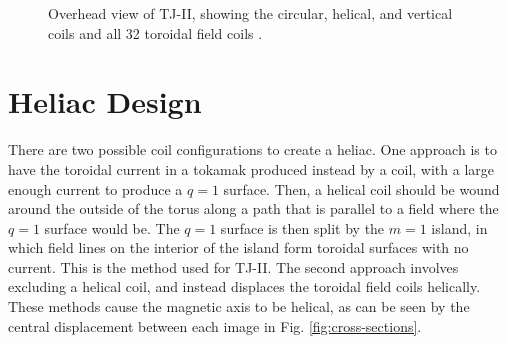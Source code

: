 \documentclass[a4paper]{article}
\begin{document}
\begin{figure}[tb]
\begin{minipage}{0.46\linewidth}
	\caption{Overhead view of TJ-II, showing the circular, helical, and vertical coils and all 32 toroidal field coils \cite{solano_study_1988}.}
	\label{fig:coils}
\end{minipage}
\end{figure}


\section*{Heliac Design}
There are two possible coil configurations to create a heliac.
One approach is to have the toroidal current in a tokamak produced instead by a coil, with a large enough current to produce a $q = 1$ surface.
Then, a helical coil should be wound around the outside of the torus along a path that is parallel to a field where the $q = 1$ surface would be.
The $q = 1$ surface is then split by the $m = 1$ island, in which field lines on the interior of the island form toroidal surfaces with no current.
This is the method used for TJ-II.
The second approach involves excluding a helical coil, and instead displaces the toroidal field coils helically\cite{boozer_what_1998}.
These methods cause the magnetic axis to be helical, as can be seen by the central displacement between each image in Fig. \ref{fig:cross-sections}.
\end{document}
